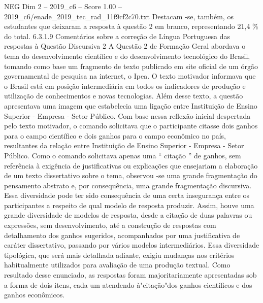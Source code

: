 \begin{textsample}{NEG Dim 2 – 2019\_c6 – Score 1.00 – 2019\_c6/enade\_2019\_tec\_rad\_11f9cf2c70.txt}
Destacam -se, também, os estudantes que deixaram a resposta à questão 2 em branco, representando 21,4 \% do total. 6.3.1.9 Comentários sobre a correção de Língua Portuguesa das respostas à Questão Discursiva 2 A Questão 2 de Formação Geral abordava o tema do desenvolvimento científico e do desenvolvimento tecnológico do Brasil, tomando como base um fragmento de texto publicado em site oficial de um órgão governamental de pesquisa na internet, o Ipea.
O texto motivador informava que o Brasil está em posição intermediária em todos os indicadores de produção e utilização de conhecimentos e novas tecnologias.
Além desse texto, a questão apresentava uma imagem que estabelecia uma ligação entre Instituição de Ensino Superior - Empresa - Setor Público.
Com base nessa reflexão inicial despertada pelo texto motivador, o comando solicitava que o participante citasse dois ganhos para o campo científico e dois ganhos para o campo econômico no país, resultantes da relação entre Instituição de Ensino Superior - Empresa - Setor Público.
Como o comando solicitava apenas uma “ citação ” de ganhos, sem referência à exigência de justificativas ou explicações que ensejariam a elaboração de um texto dissertativo sobre o tema, observou -se uma grande fragmentação do pensamento abstrato e, por consequência, uma grande fragmentação discursiva.
Essa diversidade pode ter sido consequência de uma certa insegurança entre os participantes a respeito de qual modelo de resposta produzir.
Assim, houve uma grande diversidade de modelos de resposta, desde a citação de duas palavras ou expressões, sem desenvolvimento, até a construção de respostas com detalhamento dos ganhos sugeridos, acompanhados por uma justificativa de caráter dissertativo, passando por vários modelos intermediários.
Essa diversidade tipológica, que será mais detalhada adiante, exigiu mudanças nos critérios habitualmente utilizados para avaliação de uma produção textual.
Como resultado desse enunciado, as respostas foram majoritariamente apresentadas sob a forma de dois itens, cada um atendendo à"citação"dos ganhos científicos e dos ganhos econômicos.

\end{textsample}
